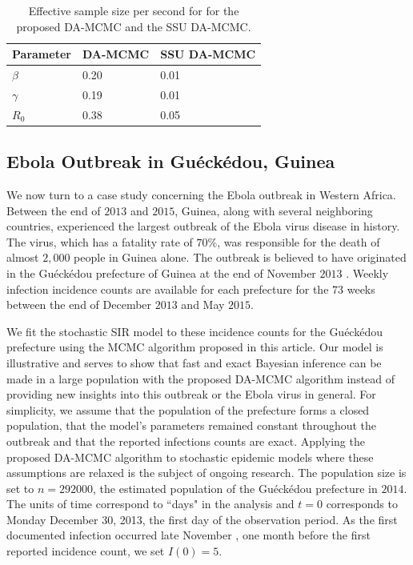 \documentclass[11pt]{article}
\newcommand{\ram}[1]{{\color{green}{ #1}}}
\begin{document}
	 \begin{table}
        \centering
        \begin{tabular}{ |C{2cm}| *{2}{C{3cm}}|}
            \hline
            Parameter & DA-MCMC & SSU DA-MCMC \\ 
            \hline
            $\beta$ & 0.20 & 0.01 \\ 
            $\gamma$ & 0.19 & 0.01 \\ 
            $R_0$ & 0.38 & 0.05 \\
            \hline
        \end{tabular}
        \caption{Effective sample size per second for for the proposed DA-MCMC and the SSU DA-MCMC.}
        \label{tab:E6}
    \end{table}
	
	\subsection{Ebola Outbreak in Gu\'eck\'edou, Guinea}
	\label{sec:ebo}
	
	We now turn to a case study concerning the Ebola outbreak in Western Africa.
	Between the end of $2013$ and $2015$, Guinea, along with several neighboring countries, experienced the largest outbreak of the Ebola virus disease in history. The virus, which has a fatality rate of $70\%$, was responsible for the death of almost $2,000$ people in Guinea alone.
	The outbreak is believed to have originated in the Gu\'eck\'edou prefecture of Guinea at the end of November $2013$ \cite{Baize.2014}. Weekly infection incidence counts are available for each prefecture for the $73$ weeks between the end of December $2013$ and May $2015$.
	
	We fit the stochastic SIR model to these incidence counts for the Gu\'eck\'edou prefecture using the MCMC algorithm proposed in this article.
	Our model is illustrative and serves to show that fast and exact Bayesian inference can be made in a large population with the proposed DA-MCMC algorithm instead of providing new insights into this outbreak or the Ebola virus in general. For simplicity, we assume that the population of the prefecture forms a closed population, that the model's parameters remained constant throughout the outbreak and that the reported infections counts are exact. 
	\ram{Justify these assumptions.}
	Applying the proposed DA-MCMC algorithm to stochastic epidemic models where these assumptions are relaxed is the subject of ongoing research.
	The population size is set to $n = 292000$, the estimated population of the Gu\'eck\'edou prefecture in $2014$.
	The units of time correspond to ``days" in the analysis and $t=0$ corresponds to Monday December 30, 2013, the first day of the observation period.
	As the first documented infection occurred late November \cite{Baize.2014}, one month before the first reported incidence count, we set $I(0) = 5$.
	
\end{document}
